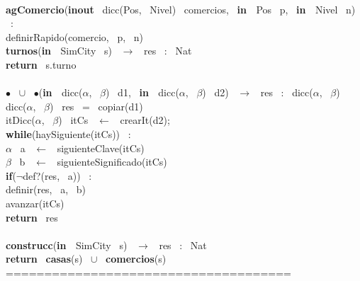 \noindent\makebox[\linewidth]{\rule{\textwidth}{0.4pt}}
\\
\noindent\makebox[\linewidth]{\rule{\textwidth}{0.4pt}}
\textbf{agComercio}(\textbf{inout} \ dicc(Pos, \ Nivel) \ comercios, \ \textbf{in \ }Pos \ p, \ \textbf{in \ }Nivel \ n) \ :\\
\indent definirRapido(comercio, \ p, \ n) \ 
\noindent\makebox[\linewidth]{\rule{\textwidth}{0.4pt}}
\\
\noindent\makebox[\linewidth]{\rule{\textwidth}{0.4pt}}
\textbf{turnos}(\textbf{in \ }SimCity \ s) \ $\rightarrow $ \ res \ : \ Nat\\
\indent \textbf{return} \ s.turno\\
\noindent\makebox[\linewidth]{\rule{\textwidth}{0.4pt}}
\\
\noindent\makebox[\linewidth]{\rule{\textwidth}{0.4pt}}
$\bullet$ \ $\cup$ \ $\bullet$(\textbf{in \ }dicc($\alpha$, \ $\beta$) \ d1, \ \textbf{in \ }dicc($\alpha$, \ $\beta$) \ d2) \ $\rightarrow $ \ res \ : \ dicc($\alpha$, \ $\beta$)\\
\indent dicc($\alpha$, \ $\beta$) \ res \ = \ copiar(d1)\\
\indent itDicc($\alpha$, \ $\beta$) \ itCs \ $\leftarrow$ \ crearIt(d2);\\
\indent \textbf{while}(haySiguiente(itCs)) \ :\\
\indent \indent $\alpha$ \ a \ $\leftarrow$ \ siguienteClave(itCs)\\
\indent \indent $\beta$ \ b \ $\leftarrow$ \ siguienteSignificado(itCs)\\
\indent \indent \textbf{if}($\neg$def?(res, \ a)) \ :\\
\indent \indent \indent definir(res, \ a, \ b)\\
\indent \indent avanzar(itCs)\\
\indent \textbf{return} \ res\\
\noindent\makebox[\linewidth]{\rule{\textwidth}{0.4pt}}
\\
\noindent\makebox[\linewidth]{\rule{\textwidth}{0.4pt}}
\textbf{construcc}(\textbf{in \ }SimCity \ s) \ $\rightarrow $ \ res \ : \ Nat\\
\indent \textbf{return} \ \textbf{casas}(s) \ $\cup$ \ \textbf{comercios}(s)\\
\noindent\makebox[\linewidth]{\rule{\textwidth}{0.4pt}}
===================================== \ \\
\\
\\
\\
